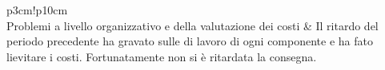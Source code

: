 \begin{longtable}{p{3cm}!{\VRule[1pt]}p{10cm}}
 \\
Problemi a livello organizzativo e della valutazione dei costi	& Il ritardo del periodo precedente ha gravato sulle di lavoro di ogni componente e ha fato lievitare i costi. Fortunatamente non si è ritardata la consegna.
\end{longtable}
